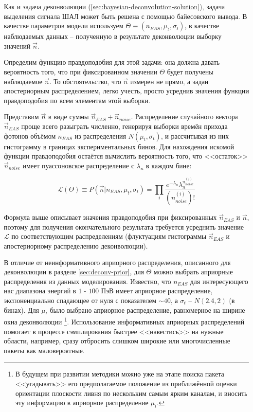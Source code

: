Как и задача деконволюции (\ref{sec:bayesian-deconvolution-solution}), задача выделения сигнала ШАЛ может быть решена с помощью байесовского вывода. В качестве параметров модели используем $\Theta \equiv (n_{EAS}, \mu_t, \sigma_t)$, в качестве наблюдаемых данных -- полученную в результате деконволюции выборку значений $\vec{n}$.

Определим функцию правдоподобия для этой задачи: она должна давать вероятность того, что при фиксированном значении $\Theta$ будет получены наблюдаемое $\vec{n}$. То обстоятельство, что $\vec{n}$ измерен не прямо, а задан апостериорным распределением, легко учесть, просто усреднив значения функции правдоподобия по всем элементам этой выборки.

Представим $\vec{n}$ в виде суммы $\vec{n}_{EAS} + \vec{n}_{noise}$. Распределение случайного вектора $\vec{n}_{EAS}$ проще всего разыграть численно, генерируя выборки времён прихода фотонов объёмом $n_{EAS}$ из распределения $N(\mu_t, \sigma_t)$, и рассчитывая из них гистограмму в границах экспериментальных бинов. Для нахождения искомой функции правдоподобия остаётся вычислить вероятность того, что <<остаток>> $\vec{n}_{noise}$ имеет пуассоновское распределение с $\lambda_{n}$ в каждом бине:

\begin{equation}
	\mathcal{L}(\Theta) \equiv P(\vec{n} | n_{EAS}, \mu_t, \sigma_t) = \prod_{i} \frac{e^{-\lambda_n} \lambda_n^{n_{noise}^{(i)}}}{(n_{noise}^{(i)})!}
\end{equation}

Формула выше описывает значения правдоподобия при фиксированных $\vec{n}_{EAS}$ и  $\vec{n}$, поэтому для получения окончательного результата требуется усреднить значение $\mathcal{L}$ по соответствующим распределениям (флуктуациям гистограммы $\vec{n}_{EAS}$ и апостериорному распределению деконволюции).

В отличие от неинформативного априорного распределения, описанного для деконволюции в разделе \ref{sec:deconv-prior}, для $\Theta$ можно выбрать априорные распределения из данных моделирования. Известно, что $n_{EAS}$ для интересующего нас диапазона энергий в $1$ - $100$ ПэВ имеет априорное распределение, экспоненциально спадающее от нуля с показателем $\sim 40$, а $\sigma_t$ -- $N(2.4, 2)$ (в бинах). Для $\mu_t$ было выбрано априорное распределение, равномерное на ширине окна деконволюции \footnote{В будущем при развитии методики можно уже на этапе поиска пакета <<угадывать>> его предполагаемое положение из приближённой оценки ориентации плоскости ливня по нескольким самым ярким каналам, и вносить эту информацию в априорное распределение $\mu_t$.}. Использование информативных априорных распределений помогает в процессе сэмплирования быстрее <<навестись>> на нужные области, например, сразу отбросить слишком широкие или многочисленные пакеты как маловероятные.

